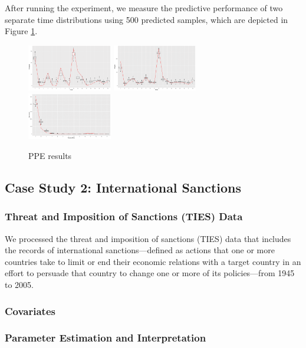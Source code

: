 \documentclass[12pt]{article}
\begin{document}
After running the experiment, we measure the predictive performance of two separate time distributions using 500 predicted samples, which are depicted in Figure \ref{figure:PPEresults}.
	\begin{figure}[!b]
		\centering
		\includegraphics[width=0.33\textwidth]{plots_paper/outdegreenew-1.png}	
		\includegraphics[width=0.33\textwidth]{plots_paper/indegreenew-1.png}	
		\includegraphics[width=0.33\textwidth]{plots_paper/recipientsizenew-1.png}	
		\caption {PPE results}
		\label{figure:PPEresults}
	\end{figure}
	
\subsection{Case Study 2: International Sanctions}\label{subsec:International Sanctions}
\subsubsection{Threat and Imposition of Sanctions (TIES) Data}\label{subsubsec:TIES}
We processed the threat and imposition of sanctions (TIES) data \citep{morgan2014threat} that includes the records of international sanctions---defined as actions that one or more countries take to limit or end their economic relations with a target country in an effort to persuade that country to change one or more of its policies---from 1945 to 2005.
\subsubsection{Covariates}\label{subsec:Covariates_sanction}
\subsubsection{Parameter Estimation and Interpretation}\label{subsubsec:Result_sanction}
\end{document}
